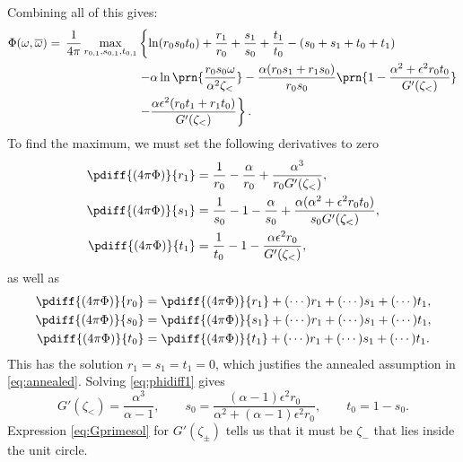 \documentclass[12pt]{article}
\newcommand{\omb}{\overline{\omega}}
\begin{document}
Combining all of this gives:
%
\begin{equation}\label{eq:phimaxrep}
\begin{aligned}
  \Phi(\omega,\omb) =\, \frac{1}{4\pi} \max_{r_{0,1},s_{0,1},t_{0,1}}& \left\{
    \ln(r_0s_0t_0) + \frac{r_1}{r_0} + \frac{s_1}{s_0} + \frac{t_1}{t_0}
    -(s_0 + s_1 + t_0 + t_1)
    \right.\\&\left.
    - \alpha\ln\prn{\frac{r_0s_0\omega}{\alpha^2\zeta_<}}
    - \frac{\alpha(r_0s_1+r_1s_0)}{r_0s_0}\prn{1-\frac{\alpha^2+\epsilon^2r_0t_0} {G'(\zeta_<)}}
    \right.\\&\left.
    - \frac{ \alpha\epsilon^2 (r_0t_1+r_1t_0)} {G'(\zeta_<)}
    \right\}.
\end{aligned}
\end{equation}
%
To find the maximum, we must set the following derivatives to zero
%
\begin{equation}\label{eq:phidiff1}
\begin{aligned}
  \pdiff{(4\pi\Phi)}{r_1} &= \frac{1}{r_0} - \frac{\alpha}{r_0} + \frac{\alpha^3}{r_0G'(\zeta_<)},  \\
  \pdiff{(4\pi\Phi)}{s_1} &= \frac{1}{s_0} - 1 - \frac{\alpha}{s_0} + \frac{\alpha(\alpha^2+\epsilon^2 r_0 t_0 )}{s_0G'(\zeta_<)},  \\
  \pdiff{(4\pi\Phi)}{t_1} &= \frac{1}{t_0} - 1 - \frac{\alpha\epsilon^2r_0}{G'(\zeta_<)},
\end{aligned}
\end{equation}
%
as well as
%
\begin{equation}\label{eq:phidiff0}
\begin{aligned}
  \pdiff{(4\pi\Phi)}{r_0} &= \pdiff{(4\pi\Phi)}{r_1} +(\cdots)r_1+(\cdots)s_1+(\cdots)t_1,  \\
  \pdiff{(4\pi\Phi)}{s_0} &= \pdiff{(4\pi\Phi)}{s_1} +(\cdots)r_1+(\cdots)s_1+(\cdots)t_1,  \\
  \pdiff{(4\pi\Phi)}{t_0} &= \pdiff{(4\pi\Phi)}{t_1} +(\cdots)r_1+(\cdots)s_1+(\cdots)t_1.
\end{aligned}
\end{equation}
%
This has the solution $r_1=s_1=t_1=0$,
which justifies the annealed assumption in \eqref{eq:annealed}.
Solving \eqref{eq:phidiff1} gives
%
\begin{equation}\label{eq:repsaddlesol}
  G'(\zeta_<) = \frac{\alpha^3}{\alpha-1},
  \qquad
  s_0 = \frac{(\alpha-1)\epsilon^2r_0}{\alpha^2+(\alpha-1)\epsilon^2r_0},
  \qquad
  t_0 = 1 - s_0.
\end{equation}
%
Expression \eqref{eq:Gprimesol} for $G'(\zeta_\pm)$ tells us that it must be $\zeta_-$ that lies inside the unit circle.
\end{document}
